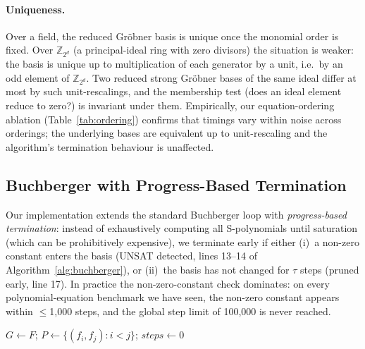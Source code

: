 \documentclass[runningheads]{llncs}
\begin{document}
\paragraph{Uniqueness.}
Over a field, the reduced Gr\"obner basis is unique once the
monomial order is fixed. Over $\mathbb{Z}_{2^d}$ (a principal-ideal
ring with zero divisors) the situation is weaker: the basis is
unique up to multiplication of each generator by a unit, i.e.\ by
an odd element of $\mathbb{Z}_{2^d}$. Two reduced strong Gr\"obner
bases of the same ideal differ at most by such unit-rescalings, and
the membership test (does an ideal element reduce to zero?) is
invariant under them. Empirically, our equation-ordering ablation
(Table~\ref{tab:ordering}) confirms that timings vary within noise
across orderings; the underlying bases are equivalent up to
unit-rescaling and the algorithm's termination behaviour is
unaffected.

\subsection{Buchberger with Progress-Based Termination}
\label{sec:algebraic-algo}

Our implementation extends the standard Buchberger loop with
\emph{progress-based termination}: instead of exhaustively
computing all S-polynomials until saturation (which can be
prohibitively expensive), we terminate early if either
(i)~a non-zero constant enters the basis (UNSAT detected, lines
13--14 of Algorithm~\ref{alg:buchberger}), or (ii)~the basis has
not changed for $\tau$ steps (pruned early, line 17). In practice
the non-zero-constant check dominates: on every polynomial-equation benchmark
we have seen, the non-zero constant appears within $\leq$1,000 steps,
and the global step limit of 100{,}000 is never reached.

\begin{algorithm}[ht]
\SetAlgoLined
\DontPrintSemicolon
{}

$G \leftarrow F$; $P \leftarrow \{(f_i, f_j) : i < j\}$;
  $\mathit{steps} \leftarrow 0$\;
\caption{Strong Gr\"obner-basis computation with progress-based
  termination}
\label{alg:buchberger}
\end{algorithm}
\end{document}
